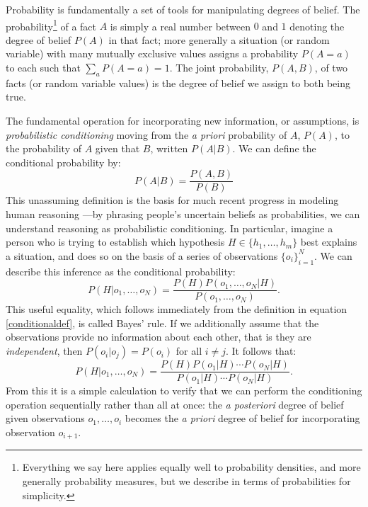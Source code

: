 \documentclass[12pt]{article}
\newcounter{definition}
\begin{document}
Probability is fundamentally a set of tools for manipulating degrees of belief. The probability\footnote{Everything we say here applies equally well to probability densities, and more generally probability measures, but we describe in terms of probabilities for simplicity.} of a fact $A$ is simply a real number between $0$ and $1$ denoting the degree of belief $P(A)$ in that fact; more generally a situation (or random variable) with many mutually exclusive values assigns a probability $P(A{=}a)$ to each such that $\sum_a P(A{=}a)=1$. The joint probability, $P(A,B)$, of two facts (or random variable values) is the degree of belief we assign to both being true. 

The fundamental operation for incorporating new information, or assumptions, is \emph{probabilistic conditioning} moving from the \emph{a priori} probability of $A$, $P(A)$, to the probability of $A$ given that $B$, written $P(A|B)$. We can define the conditional probability by:
\begin{equation}
\label{conditionaldef}
P(A|B) = \frac{P(A,B)}{P(B)} 
\end{equation}
This unassuming definition is the basis for much recent progress in modeling human reasoning \cite[e.g.][]{tenenbaum2011}---by phrasing people's uncertain beliefs as probabilities, we can understand reasoning as probabilistic conditioning. In particular, imagine a person who is trying to establish which hypothesis $H\in\{h_1,\dots,h_m\}$ best explains a situation, and does so on the basis of a series of observations $\{o_i\}_{i=1}^N$. We can describe this inference as the conditional probability:
\begin{equation}
P(H|o_1,\dots,o_N) = \frac{P(H)P(o_1,\dots,o_N|H)}{P(o_1,\dots,o_N)}.
\end{equation}
This useful equality, which follows immediately from the definition in equation \ref{conditionaldef}, is called Bayes' rule. If we additionally assume that the observations provide no information about each other, that is they are \emph{independent}, then $P(o_i|o_j)=P(o_i)$ for all $i\neq j$. It follows that:
\begin{equation}
P(H|o_1,\dots,o_N) = \frac{P(H)P(o_1|H)\cdots P(o_N|H)}{P(o_1|H)\cdots P(o_N|H)}.
\end{equation}
From this it is a simple calculation to verify that we can perform the conditioning operation sequentially rather than all at once: the \emph{a posteriori} degree of belief given observations $o_1,\dots,o_i$ becomes the \emph{a priori} degree of belief for incorporating observation $o_{i+1}$.
\end{document}
